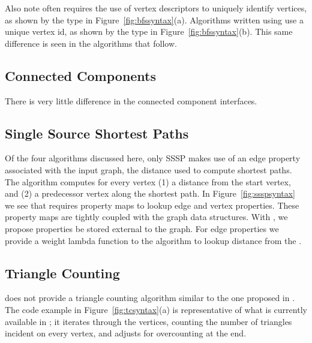 
Also note \bgl often requires the use of vertex descriptors to uniquely
identify vertices, as shown by the 
type in Figure~\ref{fig:bfssyntax}(a).
Algorithms written using \stdgraph use a unique vertex id, as shown by the
 type in Figure~\ref{fig:bfssyntax}(b).
This same difference is seen in the algorithms that follow.

\subsection{Connected Components}
There is very little difference in the connected component interfaces.


\subsection{Single Source Shortest Paths}
Of the four algorithms discussed here, only SSSP makes use of an
edge property associated with the input graph, the distance used
to compute shortest paths.
The algorithm computes for
every vertex (1) a distance from the start vertex, and (2) a predecessor
vertex along the shortest path.
In Figure~\ref{fig:ssspsyntax} we see that \bgl requires
property maps to lookup edge and vertex properties.
These property maps are tightly coupled with the graph data structures.
With \stdgraph, we propose properties be stored external to the graph.
For edge properties we provide a weight lambda function to the algorithm
to lookup distance from the .


\subsection{Triangle Counting}
\bgl does not provide a triangle counting algorithm
similar to the one proposed in \stdgraph.
The code example in Figure~\ref{fig:tcsyntax}(a) is representative of what is
currently available in \bgl; it iterates through the vertices,
counting the number of triangles
incident on every vertex, and adjusts for overcounting at the end.

